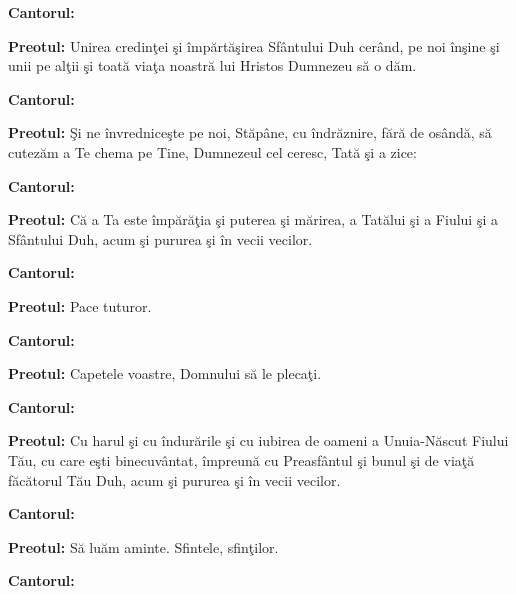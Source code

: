 \documentclass[11pt,letterpaper]{book} \usepackage{ucs}
\begin{document}
  {\bf Cantorul:}
  \begin{center}
  \end{center}  

  {\bf Preotul:} Unirea credinţei şi împărtăşirea Sfântului Duh
  cerând, pe noi înşine şi unii pe alţii şi toată viaţa noastră lui
  Hristos Dumnezeu să o dăm.

  {\bf Cantorul:}
  \begin{center}
  \end{center}

  {\bf Preotul:} Şi ne învredniceşte pe noi, Stăpâne, cu îndrăznire,
  fără de osândă, să cutezăm a Te chema pe Tine, Dumnezeul cel ceresc,
  Tată şi a zice:

  {\bf Cantorul:}


  {\bf Preotul:} Că a Ta este împărăţia şi puterea şi mărirea, a
  Tatălui şi a Fiului şi a Sfântului Duh, acum şi pururea şi în vecii
  vecilor.

  {\bf Cantorul:}
  \begin{center}
  \end{center}

  {\bf Preotul:} Pace tuturor.

  {\bf Cantorul:}
  \begin{center}
  \end{center}

  {\bf Preotul:} Capetele voastre, Domnului să le plecaţi.

  {\bf Cantorul:}
  \begin{center}
  \end{center}

  {\bf Preotul:} Cu harul şi cu îndurările şi cu iubirea de oameni a
  Unuia-Născut Fiului Tău, cu care eşti binecuvântat, împreună cu
  Preasfântul şi bunul şi de viaţă făcătorul Tău Duh, acum şi pururea
  şi în vecii vecilor.

  {\bf Cantorul:}
  \begin{center}
  \end{center}

  {\bf Preotul:} Să luăm aminte. Sfintele, sfinţilor.

  {\bf Cantorul:}

  
\end{document}
